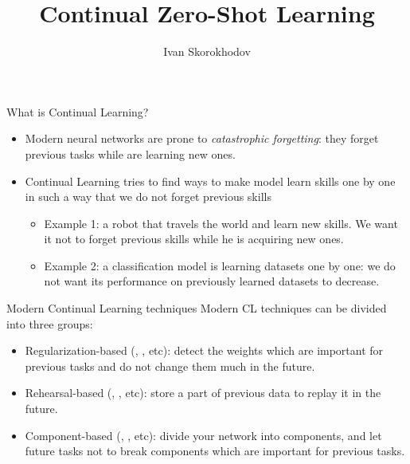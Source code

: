 \documentclass[10pt]{beamer}
\title{Continual Zero-Shot Learning}
\author{Ivan Skorokhodov}
\begin{document}
\begin{frame}
    \titlepage
\end{frame}

\begin{frame}{What is Continual Learning?}
    \begin{itemize}
        \item\pause Modern neural networks are prone to \textit{catastrophic forgetting}: they forget previous tasks while are learning new ones.
        \item\pause Continual Learning tries to find ways to make model learn skills one by one in such a way that we do not forget previous skills
        \begin{itemize}
            \item\pause Example 1: a robot that travels the world and learn new skills. We want it not to forget previous skills while he is acquiring new ones.
            \item\pause Example 2: a classification model is learning datasets one by one: we do not want its performance on previously learned datasets to decrease.
        \end{itemize}
    \end{itemize}
%    
    \begin{figure}
        
    \end{figure}
\end{frame}

\begin{frame}{Modern Continual Learning techniques}
    \pause Modern CL techniques can be divided into three groups:
    \begin{itemize}
        \item\pause Regularization-based (\cite{EWC}, \cite{MAS}, etc): detect the weights which are important for previous tasks and do not change them much in the future.
        \item\pause Rehearsal-based (\cite{A-GEM}, \cite{MeRGAN}, etc): store a part of previous data to replay it in the future. 
        \item\pause Component-based (\cite{HAT}, \cite{PathNet}, etc): divide your network into components, and let future tasks not to break components which are important for previous tasks.
    \end{itemize}
\end{frame}
\end{document}
